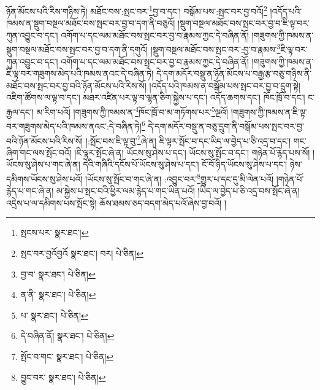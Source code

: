 ཉོན་མོངས་པའི་རིས་གཉིས་ཏེ། མཐོང་བས་:སྤང་བར་\footnote{སྤངས་པར་  སྣར་ཐང་། }བྱ་བ་དང་། བསྒོམ་པས་:སྤང་བར་བྱ་བའོ།\footnote{སྤང་བར་བྱའོབྱའོ  སྣར་ཐང་། བར།  པེ་ཅིན། } །འདོད་པའི་ཁམས་ན་སྡུག་བསྔལ་མཐོང་བས་སྤང་བར་བྱ་བ་དག་ནི་བཅུའོ། །སྡུག་བསྔལ་མཐོང་བས་སྤང་བར་བྱ་བ་ཇི་ལྟ་བར་ཀུན་འབྱུང་བ་དང་། འགོག་པ་དང་ལམ་མཐོང་བས་སྤང་བར་བྱ་བ་རྣམས་ཀྱང་དེ་བཞིན་ནོ། །གཟུགས་ཀྱི་ཁམས་ན་སྡུག་བསྔལ་མཐོང་བས་སྤང་བར་བྱ་བ་དག་ནི་དགུའོ། །སྡུག་བསྔལ་མཐོང་བས་སྤང་བར་:བྱ་བ་རྣམས་\footnote{བྱ་བ་  སྣར་ཐང་།  པེ་ཅིན། }ཇི་ལྟ་བར་ཀུན་འབྱུང་བ་དང་། འགོག་པ་དང་ལམ་མཐོང་བས་སྤང་བར་བྱ་བ་རྣམས་ཀྱང་དེ་བཞིན་ནོ། །གཟུགས་ཀྱི་ཁམས་ན་ཇི་ལྟ་བར་གཟུགས་མེད་པའི་ཁམས་ནའང་དེ་བཞིན་ཏེ། དེ་དག་མདོར་བསྡུ་ན་ཉོན་མོངས་པ་བརྒྱ་རྩ་བཅུ་གཉིས་ནི་མཐོང་བས་སྤང་བར་བྱ་བའི་ཉོན་མོངས་པའི་རིས་སོ། །འདོད་པའི་ཁམས་ན་བསྒོམ་པས་སྤང་བར་བྱ་བ་དྲུག་སྟེ། འཇིག་ཚོགས་ལ་ལྟ་བ་དང་། མཐར་འཛིན་པར་ལྟ་བ་ལྷན་ཅིག་སྐྱེས་པ་དང་། འདོད་ཆགས་དང་། ཁོང་ཁྲོ་བ་དང་། ང་རྒྱལ་དང་། མ་རིག་པའོ། །གཟུགས་ཀྱི་ཁམས་ན་\footnote{ན་ནི་  སྣར་ཐང་།  པེ་ཅིན། }ཁོང་ཁྲོ་བ་མ་གཏོགས་པར་\footnote{པ་  སྣར་ཐང་།  པེ་ཅིན། }ལྔའོ། །གཟུགས་ཀྱི་ཁམས་ན་ཇི་ལྟ་བར་གཟུགས་མེད་པའི་ཁམས་ནའང་:དེ་བཞིན་ཏེ།\footnote{དེ་བཞིན་ནོ།  སྣར་ཐང་།  པེ་ཅིན། } དེ་དག་མདོར་བསྡུ་ན་བཅུ་དྲུག་ནི་བསྒོམ་པས་སྤང་བར་བྱ་བའི་ཉོན་མོངས་པའི་རིས་སོ། །:སྤོང་བས་ཇི་ལྟ་བུ་\footnote{སྤོང་བ་གང་  སྣར་ཐང་།  པེ་ཅིན། }ཞེ་ན། ཇི་ལྟར་སྤོང་བ་དང་ཡིད་ལ་བྱེད་པ་ཅི་འདྲ་བ་དང་། གང་ཞིག་གང་ལས་སྤོང་བའོ། །ཇི་ལྟར་སྤོང་ཞེ་ན། ཡོངས་སུ་ཤེས་པ་དང་། ཡོངས་སུ་སྤོང་བ་དང་། གཉེན་པོ་རྙེད་པས་སོ། །ཡོངས་སུ་ཤེས་པ་གང་ཞེ་ན། དེའི་གཞིའི་དངོས་པོ་ཡོངས་སུ་ཤེས་པ་དང་། ངོ་བོ་ཉིད་ཡོངས་སུ་ཤེས་པ་དང་། ཉེས་དམིགས་ཡོངས་སུ་ཤེས་པའོ། །ཡོངས་སུ་སྤོང་བ་གང་ཞེ་ན། :འབྱུང་བར་\footnote{བྱུང་བར་  སྣར་ཐང་།  པེ་ཅིན། }གྱུར་པ་དང་དུ་མི་ལེན་པའོ། །གཉེན་པོ་རྙེད་པ་གང་ཞེ་ན། མ་སྐྱེས་པ་སྤང་བའི་ཕྱིར་ལམ་རྙེད་པ་གང་ཡིན་པའོ། །ཡིད་ལ་བྱེད་པ་ཅི་འདྲ་བས་སྤོང་ཞེ་ན། འདྲེས་པ་ལ་དམིགས་པས་སྤོང་སྟེ། ཆོས་ཐམས་ཅད་བདག་མེད་པའོ་ཞེས་བྱ་བའོ། །

